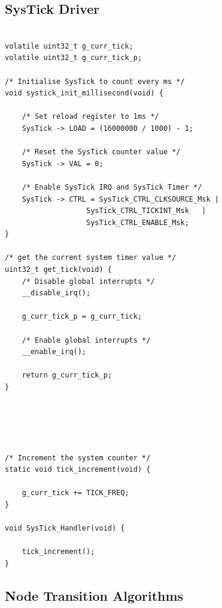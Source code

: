 \documentclass[12pt]{article}
\numberwithin{subsubsubsection}{subsubsection}
\begin{document}
\subsection{SysTick Driver}
\begin{verbatim}

volatile uint32_t g_curr_tick;
volatile uint32_t g_curr_tick_p;

/* Initialise SysTick to count every ms */
void systick_init_millisecond(void) {
    
    /* Set reload register to 1ms */
    SysTick -> LOAD = (16000000 / 1000) - 1;
    
    /* Reset the SysTick counter value */
    SysTick -> VAL = 0;

    /* Enable SysTick IRQ and SysTick Timer */
    SysTick -> CTRL = SysTick_CTRL_CLKSOURCE_Msk |
    			   SysTick_CTRL_TICKINT_Msk   |
				   SysTick_CTRL_ENABLE_Msk;
}

/* get the current system timer value */
uint32_t get_tick(void) {
    /* Disable global interrupts */
    __disable_irq();
    
    g_curr_tick_p = g_curr_tick;
    
    /* Enable global interrupts */
    __enable_irq();
    
    return g_curr_tick_p;
}





/* Increment the system counter */
static void tick_increment(void) {

    g_curr_tick += TICK_FREQ;
}

void SysTick_Handler(void) {

    tick_increment();
}
\end{verbatim}
\newpage
\subsection{Node Transition Algorithms}
\end{document}
